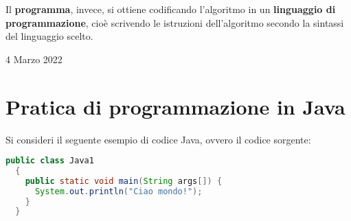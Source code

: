 \documentclass[a4paper]{extarticle}
\begin{document}
\vspace{1em}
\noindent
Il \textbf{programma}, invece, si ottiene codificando l’algoritmo in un \textbf{linguaggio di programmazione}, cioè scrivendo le istruzioni dell’algoritmo secondo la sintassi del linguaggio scelto.

\newpage
\begin{center}
  4 Marzo 2022
\end{center}

\section{Pratica di programmazione in Java}
Si consideri il seguente esempio di codice Java, ovvero il codice sorgente:

\begin{lstlisting}[language=Java, caption=Esempio di codice sorgente in Java]
  public class Java1
  {
    public static void main(String args[]) {
      System.out.println("Ciao mondo!");
    }
  }
\end{lstlisting}
\end{document}
